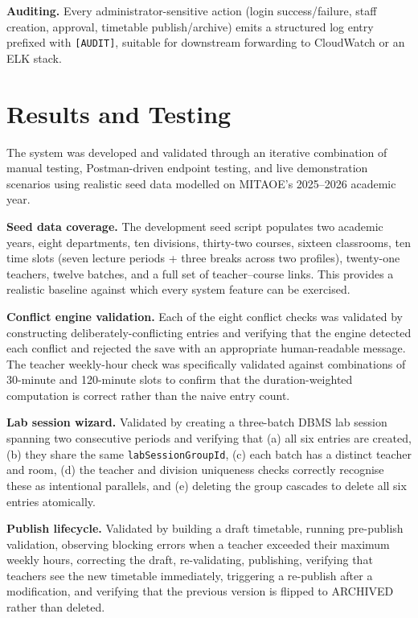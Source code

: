 \textbf{Auditing.} Every administrator-sensitive action (login success/failure, staff creation, approval, timetable publish/archive) emits a structured log entry prefixed with \texttt{[AUDIT]}, suitable for downstream forwarding to CloudWatch or an ELK stack.

\section{Results and Testing}

The system was developed and validated through an iterative combination of manual testing, Postman-driven endpoint testing, and live demonstration scenarios using realistic seed data modelled on MITAOE's 2025--2026 academic year.

\textbf{Seed data coverage.} The development seed script populates two academic years, eight departments, ten divisions, thirty-two courses, sixteen classrooms, ten time slots (seven lecture periods + three breaks across two profiles), twenty-one teachers, twelve batches, and a full set of teacher--course links. This provides a realistic baseline against which every system feature can be exercised.

\textbf{Conflict engine validation.} Each of the eight conflict checks was validated by constructing deliberately-conflicting entries and verifying that the engine detected each conflict and rejected the save with an appropriate human-readable message. The teacher weekly-hour check was specifically validated against combinations of 30-minute and 120-minute slots to confirm that the duration-weighted computation is correct rather than the naive entry count.

\textbf{Lab session wizard.} Validated by creating a three-batch DBMS lab session spanning two consecutive periods and verifying that (a) all six entries are created, (b) they share the same \texttt{labSessionGroupId}, (c) each batch has a distinct teacher and room, (d) the teacher and division uniqueness checks correctly recognise these as intentional parallels, and (e) deleting the group cascades to delete all six entries atomically.

\textbf{Publish lifecycle.} Validated by building a draft timetable, running pre-publish validation, observing blocking errors when a teacher exceeded their maximum weekly hours, correcting the draft, re-validating, publishing, verifying that teachers see the new timetable immediately, triggering a re-publish after a modification, and verifying that the previous version is flipped to ARCHIVED rather than deleted.

